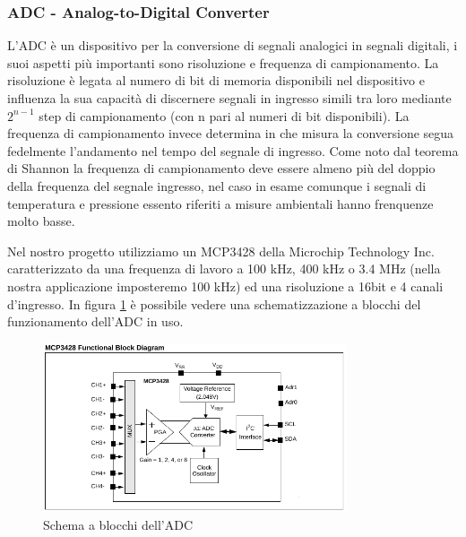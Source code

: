 \documentclass[10pt]{article}
\begin{document}
		\subsubsection{ADC - Analog-to-Digital Converter}\label{sec:adc}
		L'ADC è un dispositivo per la conversione di segnali analogici in segnali digitali, i suoi aspetti più importanti sono risoluzione e frequenza di campionamento.
		La risoluzione è legata al numero di bit di memoria disponibili nel dispositivo e influenza la sua capacità di discernere segnali in ingresso simili tra loro mediante $2^{n-1}$ step di campionamento (con n pari al numeri di bit disponibili). La frequenza di campionamento invece determina in che misura la conversione segua fedelmente l'andamento nel tempo del segnale di ingresso. Come noto dal teorema di Shannon la frequenza di campionamento deve essere almeno più del doppio della frequenza del segnale ingresso, nel caso in esame comunque i segnali di temperatura e pressione essento riferiti a misure ambientali hanno frenquenze molto basse.
		
		Nel nostro progetto utilizziamo un MCP3428 della Microchip Technology Inc. caratterizzato da una frequenza di lavoro a 100 kHz, 400 kHz o 3.4 MHz (nella nostra applicazione imposteremo 100 kHz) ed una risoluzione a 16bit e 4 canali d'ingresso. In figura \ref{fig:adc} è possibile vedere una schematizzazione a blocchi del funzionamento dell'ADC in uso.
		\begin{figure}[h]
		\centering
		\includegraphics[width=0.8\textwidth]{src/adc_block}
		\caption{Schema a blocchi dell'ADC}\label{fig:adc}
		\end{figure}
\end{document}
